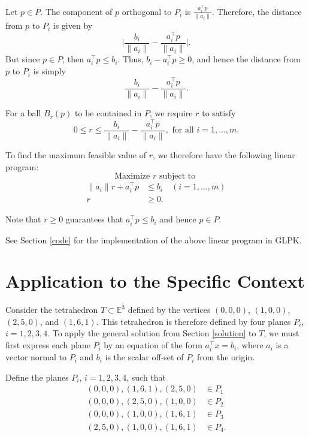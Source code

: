 \documentclass[12pt, a4paper, notitlepage]{report}
\newcommand{\EE}{\mathbb{E}}
\begin{document}
Let $p\in P$. The component of $p$ orthogonal to $P_i$ is $\frac{a_i^\top p}{\|a_i\|}$. Therefore, the distance from $p$ to $P_i$ is given by
\[ \lvert\frac{b_i}{\|a_i\|} - \frac{a_i^\top p}{\|a_i\|}\rvert. \]
But since $p\in P$, then $a_i^\top p \leq b_i$. Thus, $b_i-a_i^\top p \geq 0$, and hence the distance from $p$ to $P_i$ is simply
\[ \frac{b_i}{\|a_i\|} - \frac{a_i^\top p}{\|a_i\|}. \]

For a ball $B_r(p)$ to be contained in $P$, we require $r$ to satisfy
\[ 0 \leq r \leq \frac{b_i}{\|a_i\|} - \frac{a_i^\top p}{\|a_i\|},
\mbox{ for all } i=1,\ldots,m. \]

To find the maximum feasible value of $r$, we therefore have the following linear program:
\[ \mbox{Maximize } r \mbox{ subject to } \]
\begin{align*}
\|a_i\|r + a_i^\top p &\leq b_i
\quad (i=1,\ldots,m) \\
r &\geq 0.
\end{align*}

Note that $r\geq 0$ guarantees that $a_i^\top p\leq b_i$ and hence $p\in P$.

See Section \ref{code} for the implementation of the above linear program in GLPK.

\section{Application to the Specific Context} \label{application}

Consider the tetrahedron $T\subset\EE^3$ defined by the vertices $(0,0,0)$, $(1,0,0)$, $(2,5,0)$, and $(1,6,1)$. This tetrahedron is therefore defined by four planes $P_i$, $i=1,2,3,4$. To apply the general solution from Section \ref{solution} to $T$, we must first express each plane $P_i$ by an equation of the form $a_i^\top x = b_i$, where $a_i$ is a vector normal to $P_i$ and $b_i$ is the scalar off-set of $P_i$ from the origin.

Define the planes $P_i$, $i=1,2,3,4$, such that
\begin{align*}
(0,0,0), (1,6,1), (2,5,0) &\in P_1 \\
(0,0,0), (2,5,0), (1,0,0) &\in P_2 \\
(0,0,0), (1,0,0), (1,6,1) &\in P_3 \\
(2,5,0), (1,0,0), (1,6,1) &\in P_4.
\end{align*}
\end{document}

